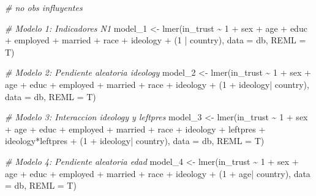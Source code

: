 \documentclass[
  12pt,
  a4paper,
]{article}
\newenvironment{Shaded}{\begin{snugshade}}{\end{snugshade}}
\newcommand{\AttributeTok}[1]{\textcolor[rgb]{0.77,0.63,0.00}{#1}}
\newcommand{\CommentTok}[1]{\textcolor[rgb]{0.56,0.35,0.01}{\textit{#1}}}
\newcommand{\DecValTok}[1]{\textcolor[rgb]{0.00,0.00,0.81}{#1}}
\newcommand{\FunctionTok}[1]{\textcolor[rgb]{0.00,0.00,0.00}{#1}}
\newcommand{\NormalTok}[1]{#1}
\newcommand{\OtherTok}[1]{\textcolor[rgb]{0.56,0.35,0.01}{#1}}
\newcommand{\SpecialCharTok}[1]{\textcolor[rgb]{0.00,0.00,0.00}{#1}}
\begin{document}
\begin{Shaded}
\begin{Highlighting}[]
\CommentTok{\# no obs influyentes}

\CommentTok{\# Modelo 1: Indicadores N1}
\NormalTok{model\_1 }\OtherTok{\textless{}{-}} \FunctionTok{lmer}\NormalTok{(in\_trust }\SpecialCharTok{\textasciitilde{}} \DecValTok{1} \SpecialCharTok{+}\NormalTok{ sex }\SpecialCharTok{+}\NormalTok{ age }\SpecialCharTok{+}\NormalTok{ educ }\SpecialCharTok{+}\NormalTok{ employed }\SpecialCharTok{+}\NormalTok{ married }\SpecialCharTok{+}
\NormalTok{                race }\SpecialCharTok{+}\NormalTok{ ideology }\SpecialCharTok{+}\NormalTok{ (}\DecValTok{1} \SpecialCharTok{|}\NormalTok{ country),}
                \AttributeTok{data =}\NormalTok{ db, }
                \AttributeTok{REML =}\NormalTok{ T)}

\CommentTok{\# Modelo 2: Pendiente aleatoria ideology}
\NormalTok{model\_2 }\OtherTok{\textless{}{-}} \FunctionTok{lmer}\NormalTok{(in\_trust }\SpecialCharTok{\textasciitilde{}} \DecValTok{1} \SpecialCharTok{+}\NormalTok{ sex }\SpecialCharTok{+}\NormalTok{ age }\SpecialCharTok{+}\NormalTok{ educ }\SpecialCharTok{+}\NormalTok{ employed }\SpecialCharTok{+}\NormalTok{ married }\SpecialCharTok{+}
\NormalTok{                race }\SpecialCharTok{+}\NormalTok{ ideology }\SpecialCharTok{+}\NormalTok{ (}\DecValTok{1} \SpecialCharTok{+}\NormalTok{ ideology}\SpecialCharTok{|}\NormalTok{ country),}
                \AttributeTok{data =}\NormalTok{ db, }
                \AttributeTok{REML =}\NormalTok{ T)}

\CommentTok{\# Modelo 3: Interaccion ideology y leftpres}
\NormalTok{model\_3 }\OtherTok{\textless{}{-}} \FunctionTok{lmer}\NormalTok{(in\_trust }\SpecialCharTok{\textasciitilde{}} \DecValTok{1} \SpecialCharTok{+}\NormalTok{ sex }\SpecialCharTok{+}\NormalTok{ age }\SpecialCharTok{+}\NormalTok{ educ }\SpecialCharTok{+}\NormalTok{ employed }\SpecialCharTok{+}\NormalTok{ married }\SpecialCharTok{+}
\NormalTok{                race }\SpecialCharTok{+}\NormalTok{ ideology }\SpecialCharTok{+}\NormalTok{ leftpres }\SpecialCharTok{+}\NormalTok{ ideology}\SpecialCharTok{*}\NormalTok{leftpres }\SpecialCharTok{+} 
\NormalTok{                (}\DecValTok{1} \SpecialCharTok{+}\NormalTok{ ideology}\SpecialCharTok{|}\NormalTok{ country),}
                \AttributeTok{data =}\NormalTok{ db, }
                \AttributeTok{REML =}\NormalTok{ T)}

\CommentTok{\# Modelo 4: Pendiente aleatoria edad}
\NormalTok{model\_4 }\OtherTok{\textless{}{-}} \FunctionTok{lmer}\NormalTok{(in\_trust }\SpecialCharTok{\textasciitilde{}} \DecValTok{1} \SpecialCharTok{+}\NormalTok{ sex }\SpecialCharTok{+}\NormalTok{ age }\SpecialCharTok{+}\NormalTok{ educ }\SpecialCharTok{+}\NormalTok{ employed }\SpecialCharTok{+}\NormalTok{ married }\SpecialCharTok{+}
\NormalTok{                race }\SpecialCharTok{+}\NormalTok{ ideology }\SpecialCharTok{+}\NormalTok{ (}\DecValTok{1} \SpecialCharTok{+}\NormalTok{ age}\SpecialCharTok{|}\NormalTok{ country),}
                \AttributeTok{data =}\NormalTok{ db, }
                \AttributeTok{REML =}\NormalTok{ T)}


\end{Highlighting}
\end{Shaded}
\end{document}
